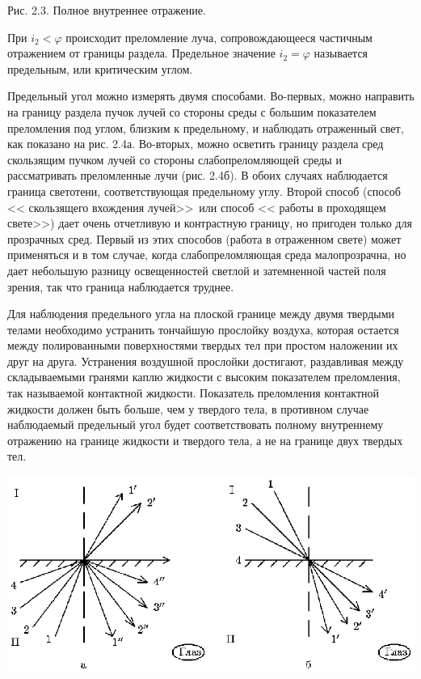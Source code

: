 \leftskip 0cm\centerline{\ris Рис. 2.3. Полное внутреннее
отражение.} \vskip 0.5mm  \vskip 2mm При $i_2<\varphi$
происходит преломление луча, сопровождающееся частичным отражением
от границы раздела. Предельное значение $i_2=\varphi$ называется
предельным, или критическим углом.

Предельный угол можно измерять двумя способами. Во-первых, можно
направить на границу раздела пучок лучей со стороны среды с
большим показателем преломления под углом, близким к предельному,
и наблюдать отраженный свет, как показано на рис. 2.4а. Во-вторых,
можно осветить границу раздела сред скользящим пучком лучей со
стороны слабопреломляющей среды и рассматривать преломленные лучи
(рис. 2.4б). В обоих случаях наблюдается граница светотени,
соответствующая предельному углу. Второй способ (способ <<
скользящего вхождения лучей>>\ или способ << работы в проходящем
свете>>) дает очень отчетливую и контрастную границу, но пригоден
только для прозрачных сред. Первый из этих способов (работа в
отраженном свете) может применяться и в том случае, когда
слабопреломляющая среда малопрозрачна, но дает небольшую разницу
освещенностей светлой и затемненной частей поля зрения, так что
граница наблюдается труднее.

Для наблюдения предельного угла на плоской границе между двумя
твердыми телами необходимо устранить тончайшую прослойку воздуха,
которая остается между полированными поверхностями твердых тел при
простом наложении их друг на друга. Устранения воздушной прослойки
достигают, раздавливая между складываемыми гранями каплю жидкости
с высоким показателем преломления, так называемой контактной
жидкости. Показатель преломления контактной жидкости должен быть
больше, чем у твердого тела, в противном случае наблюдаемый
предельный угол будет соответствовать полному внутреннему
отражению на границе жидкости и твердого тела, а не на границе
двух твердых тел.

\vskip 3mm
\centerline{\hbox{\includegraphics[scale=0.7]{Ris/ris_eps/ris2_04.eps}}}

